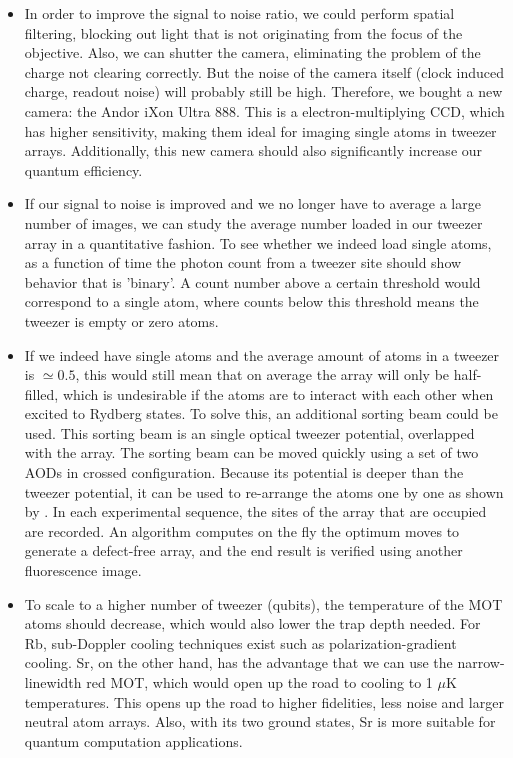 \begin{itemize}
    \item In order to improve the signal to noise ratio, we could perform spatial filtering, blocking out light that is not originating from the focus of the objective.
    Also, we can shutter the camera, eliminating the problem of the charge not clearing correctly. 
    But the noise of the camera itself (clock induced charge, readout noise) will probably still be high. 
    Therefore, we bought a new camera: the Andor iXon Ultra 888.
    This is a electron-multiplying \ac{CCD}, which has higher sensitivity, making them ideal for imaging single atoms in tweezer arrays.
    Additionally, this new camera should also significantly increase our quantum efficiency.
    
    \item If our signal to noise is improved and we no longer have to average a large number of images, we can study the average number loaded in our tweezer array in a quantitative fashion.
    To see whether we indeed load single atoms, as a function of time the photon count from a tweezer site should show behavior that is 'binary'. A count number above a certain threshold would correspond to a single atom, where counts below this threshold means the tweezer is empty or zero atoms. 
    
    \item If we indeed have single atoms and the average amount of atoms in a tweezer is $\simeq 0.5$, this would still mean that on average the array will only be half-filled, which is undesirable if the atoms are to interact with each other when excited to Rydberg states. 
    To solve this, an additional sorting beam could be used. 
    This sorting beam is an single optical tweezer potential, overlapped with the array. 
    The sorting beam can be moved quickly using a set of two \ac{AOD}s in crossed configuration.
    Because its potential is deeper than the tweezer potential, it can be used to re-arrange the atoms one by one as shown by \cite{Barredo2016}.
    In each experimental sequence, the sites of the array that are occupied are recorded. 
    An algorithm computes on the fly the optimum moves to generate a defect-free array, and the end result is verified using another fluorescence image. 
    
    \item To scale to a higher number of tweezer (qubits), the temperature of the MOT atoms should decrease, which would also lower the trap depth needed. 
    For Rb, sub-Doppler cooling techniques exist such as polarization-gradient cooling. 
    Sr, on the other hand, has the advantage that we can use the narrow-linewidth red MOT, which would open up the road to cooling to 1 $\mu$K temperatures.
    This opens up the road to higher fidelities, less noise and larger neutral atom arrays. 
    Also, with its two ground states, Sr is more suitable for quantum computation applications.
    

\end{itemize}
